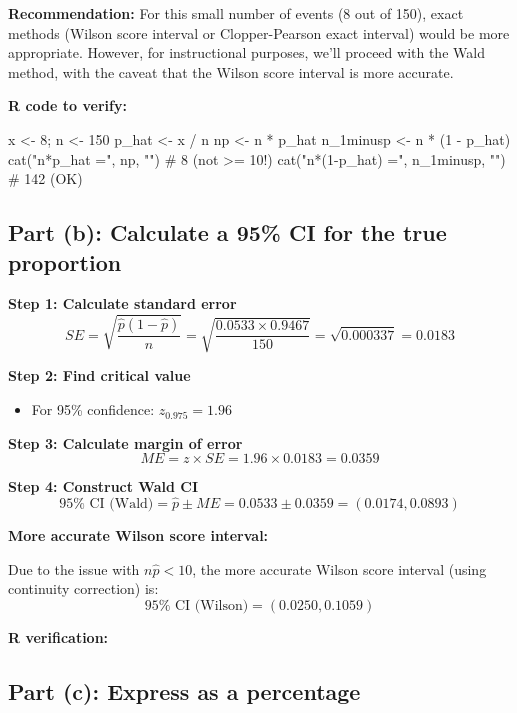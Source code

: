 \documentclass[11pt]{article}
\begin{document}
\textbf{Recommendation:} For this small number of events (8 out of 150), exact methods (Wilson score interval or Clopper-Pearson exact interval) would be more appropriate. However, for instructional purposes, we'll proceed with the Wald method, with the caveat that the Wilson score interval is more accurate.

\textbf{R code to verify:}
\begin{rcode}
x <- 8; n <- 150
p_hat <- x / n
np <- n * p_hat
n_1minusp <- n * (1 - p_hat)
cat("n*p_hat =", np, "\n")  # 8 (not >= 10!)
cat("n*(1-p_hat) =", n_1minusp, "\n")  # 142 (OK)
\end{rcode}

\subsection*{Part (b): Calculate a 95\% CI for the true proportion}

\textbf{Step 1: Calculate standard error}
$$SE = \sqrt{\frac{\hat{p}(1-\hat{p})}{n}} = \sqrt{\frac{0.0533 \times 0.9467}{150}} = \sqrt{0.000337} = 0.0183$$

\textbf{Step 2: Find critical value}
\begin{itemize}
\item For 95\% confidence: $z_{0.975} = 1.96$
\end{itemize}

\textbf{Step 3: Calculate margin of error}
$$ME = z \times SE = 1.96 \times 0.0183 = 0.0359$$

\textbf{Step 4: Construct Wald CI}
$$95\% \text{ CI (Wald)} = \hat{p} \pm ME = 0.0533 \pm 0.0359 = (0.0174, 0.0893)$$

\textbf{More accurate Wilson score interval:}

Due to the issue with $n\hat{p} < 10$, the more accurate Wilson score interval (using continuity correction) is:
$$95\% \text{ CI (Wilson)} = (0.0250, 0.1059)$$

\textbf{R verification:}

\subsection*{Part (c): Express as a percentage}
\end{document}

